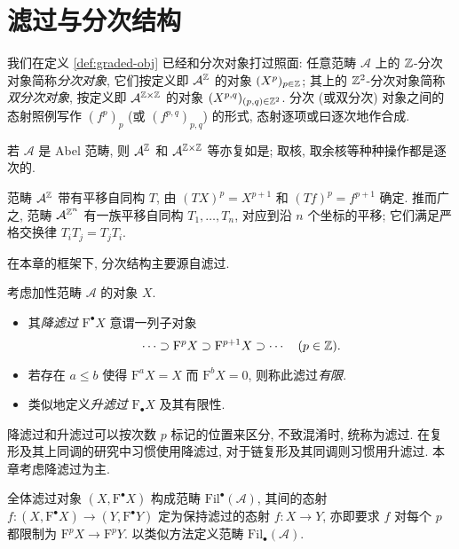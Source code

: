 \section{滤过与分次结构}\label{sec:grading-filtration}
我们在定义 \ref{def:graded-obj} 已经和分次对象打过照面: 任意范畴 $\mathcal{A}$ 上的 $\mathbb{Z}$-分次对象简称\emph{分次对象}, 它们按定义即 $\mathcal{A}^{\mathbb{Z}}$ 的对象 $(X^p)_{p \in \mathbb{Z}}$; 其上的 $\mathbb{Z}^2$-分次对象简称\emph{双分次对象}, 按定义即 $\mathcal{A}^{\mathbb{Z} \times \mathbb{Z}}$ 的对象 $(X^{p,q})_{(p,q) \in \mathbb{Z}^2}$. 分次 (或双分次) 对象之间的态射照例写作 $(f^p)_p$ (或 $(f^{p,q})_{p,q}$) 的形式, 态射逐项或曰逐次地作合成. 

若 $\mathcal{A}$ 是 Abel 范畴, 则 $\mathcal{A}^{\mathbb{Z}}$ 和 $\mathcal{A}^{\mathbb{Z} \times \mathbb{Z}}$ 等亦复如是; 取核, 取余核等种种操作都是逐次的.

范畴 $\mathcal{A}^{\mathbb{Z}}$ 带有平移自同构 $T$, 由 $(TX)^p = X^{p+1}$ 和 $(Tf)^p = f^{p+1}$ 确定. 推而广之, 范畴 $\mathcal{A}^{\mathbb{Z}^n}$ 有一族平移自同构 $T_1, \ldots, T_n$, 对应到沿 $n$ 个坐标的平移; 它们满足严格交换律 $T_i T_j = T_j T_i$.

在本章的框架下, 分次结构主要源自滤过.

\begin{definition}\label{def:filtration}
	考虑加性范畴 $\mathcal{A}$ 的对象 $X$.
	\begin{itemize}
		\item 其\emph{降滤过} $\mathrm{F}^\bullet X$ 意谓一列子对象
		\[ \cdots \supset \mathrm{F}^p X \supset \mathrm{F}^{p+1} X \supset \cdots \quad (p \in \mathbb{Z}). \]
		\item 若存在 $a \leq b$ 使得 $\mathrm{F}^a X = X$ 而 $\mathrm{F}^b X = 0$, 则称此滤过\emph{有限}.
		\item 类似地定义\emph{升滤过} $\mathrm{F}_\bullet X$ 及其有限性.
	\end{itemize}
\end{definition}

降滤过和升滤过可以按次数 $p$ 标记的位置来区分, 不致混淆时, 统称为滤过. 在复形及其上同调的研究中习惯使用降滤过, 对于链复形及其同调则习惯用升滤过. 本章考虑降滤过为主.

全体滤过对象 $(X, \mathrm{F}^\bullet X)$ 构成范畴 $\mathrm{Fil}^\bullet(\mathcal{A})$, 其间的态射 $f: (X, \mathrm{F}^\bullet X) \to (Y, \mathrm{F}^\bullet Y)$ 定为保持滤过的态射 $f: X \to Y$, 亦即要求 $f$ 对每个 $p$ 都限制为 $\mathrm{F}^p X \to \mathrm{F}^p Y$. 以类似方法定义范畴 $\mathrm{Fil}_\bullet (\mathcal{A})$. 

